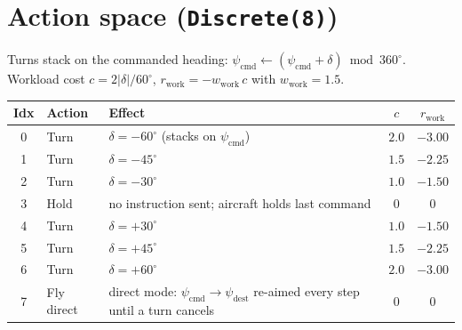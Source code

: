 \documentclass[11pt, a4paper]{article}
\begin{document}
\section{Action space (\texttt{Discrete(8)})}
Turns stack on the commanded heading: $\psi_\text{cmd}\leftarrow(\psi_\text{cmd}+\delta)\bmod360^\circ$.
Workload cost $c=2|\delta|/60^\circ$, $r_\text{work}=-w_\text{work}\,c$ with $w_\text{work}=1.5$.
\begin{table}[h]\centering
\begin{tabular}{cllcc}
\toprule
Idx & Action & Effect & $c$ & $r_\text{work}$\\
\midrule
0 & Turn       & $\delta=-60^\circ$ (stacks on $\psi_\text{cmd}$)              & $2.0$ & $-3.00$\\
1 & Turn       & $\delta=-45^\circ$                                            & $1.5$ & $-2.25$\\
2 & Turn       & $\delta=-30^\circ$                                            & $1.0$ & $-1.50$\\
3 & Hold       & no instruction sent; aircraft holds last command             & $0$   & $0$\\
4 & Turn       & $\delta=+30^\circ$                                            & $1.0$ & $-1.50$\\
5 & Turn       & $\delta=+45^\circ$                                            & $1.5$ & $-2.25$\\
6 & Turn       & $\delta=+60^\circ$                                            & $2.0$ & $-3.00$\\
7 & Fly direct & direct mode: $\psi_\text{cmd}\!\to\!\psi_\text{dest}$ re-aimed every step until a turn cancels & $0$ & $0$\\
\bottomrule
\end{tabular}
\end{table}

\end{document}
